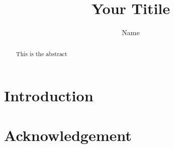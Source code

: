 \documentclass[coverpage]{inftechrep}
\begin{document}
\title{\Huge{Your Titile}}
\author{Name}


\maketitle

\begin{abstract}
This is the abstract
\end{abstract}

\section{Introduction}


\section*{Acknowledgement}

\printbibliography
\end{document}
